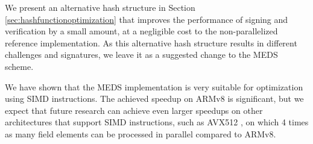 \documentclass[11pt,a4paper]{report}
\theoremstyle{definition}
\begin{document}
We present an alternative hash structure in Section \ref{sec:hashfunctionoptimization} that improves the performance of signing and verification by a small amount, at a negligible cost to the non-parallelized reference implementation. As this alternative hash structure results in different challenges and signatures, we leave it as a suggested change to the MEDS scheme.

We have shown that the MEDS implementation is very suitable for optimization using SIMD instructions. The achieved speedup on ARMv8 is significant, but we expect that future research can achieve even larger speedups on other architectures that support SIMD instructions, such as AVX512 \cite{intel-avx512}, on which 4 times as many field elements can be processed in parallel compared to ARMv8.





\appendix


\end{document}
